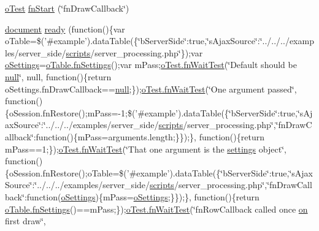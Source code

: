 \begin{DoxyCompactItemize}
\item 
\hyperlink{unit__test_8js_a3b2d259e2df3b6860d9047a92d09d0d6}{o\+Test} \hyperlink{4__server-side_2fn_draw_callback_8js_aa7072bcc36a7d3e1e58e8411fd1ed480}{fn\+Start} (\char`\"{}fn\+Draw\+Callback\char`\"{})
\item 
\hyperlink{outside_events_8js_aa14f8e0338cced6720590fd2ea13bd4b}{document} \hyperlink{4__server-side_2fn_draw_callback_8js_a7ab7695a6a02f5184cfc1fb9206111a5}{ready} (function()\{var o\+Table=\$('\#example').data\+Table(\{\char`\"{}b\+Server\+Side\char`\"{}\+:true,\char`\"{}s\+Ajax\+Source\char`\"{}\+:\char`\"{}../../../examples/server\+\_\+side/\hyperlink{tinymce_8jquery_8dev_8js_a09066d4d580eeec222f858d588b4cdef}{scripts}/server\+\_\+processing.\+php\char`\"{}\});var \hyperlink{model_8settings_8js_a4857b9c813b4dea010668e9555d0aca7}{o\+Settings}=\hyperlink{api_8methods_8js_a78f387fab92a85c2cb7830bc5d8a6141}{o\+Table.\+fn\+Settings}();var m\+Pass;\hyperlink{onhold_24__server-side_2__zero__config_8js_ab25c4d596771c0133cdc45178ce72c3d}{o\+Test.\+fn\+Wait\+Test}(\char`\"{}Default should be \hyperlink{validate_8js_afb8e110345c45e74478894341ab6b28e}{null}\char`\"{}, null, function()\{return o\+Settings.\+fn\+Draw\+Callback==\hyperlink{validate_8js_afb8e110345c45e74478894341ab6b28e}{null};\});\hyperlink{onhold_24__server-side_2__zero__config_8js_ab25c4d596771c0133cdc45178ce72c3d}{o\+Test.\+fn\+Wait\+Test}(\char`\"{}One argument passed\char`\"{}, function()\{o\+Session.\+fn\+Restore();m\+Pass=-\/1;\$('\#example').data\+Table(\{\char`\"{}b\+Server\+Side\char`\"{}\+:true,\char`\"{}s\+Ajax\+Source\char`\"{}\+:\char`\"{}../../../examples/server\+\_\+side/\hyperlink{tinymce_8jquery_8dev_8js_a09066d4d580eeec222f858d588b4cdef}{scripts}/server\+\_\+processing.\+php\char`\"{},\char`\"{}fn\+Draw\+Callback\char`\"{}\+:function()\{m\+Pass=arguments.\+length;\}\});\}, function()\{return m\+Pass==1;\});\hyperlink{onhold_24__server-side_2__zero__config_8js_ab25c4d596771c0133cdc45178ce72c3d}{o\+Test.\+fn\+Wait\+Test}(\char`\"{}That one argument is the \hyperlink{jquery_8tooltip_8js_a52fb9116a07f71570fbf0bd12ff4c9f8}{settings} object\char`\"{}, function()\{o\+Session.\+fn\+Restore();o\+Table=\$('\#example').data\+Table(\{\char`\"{}b\+Server\+Side\char`\"{}\+:true,\char`\"{}s\+Ajax\+Source\char`\"{}\+:\char`\"{}../../../examples/server\+\_\+side/\hyperlink{tinymce_8jquery_8dev_8js_a09066d4d580eeec222f858d588b4cdef}{scripts}/server\+\_\+processing.\+php\char`\"{},\char`\"{}fn\+Draw\+Callback\char`\"{}\+:function(\hyperlink{model_8settings_8js_a4857b9c813b4dea010668e9555d0aca7}{o\+Settings})\{m\+Pass=\hyperlink{model_8settings_8js_a4857b9c813b4dea010668e9555d0aca7}{o\+Settings};\}\});\}, function()\{return \hyperlink{api_8methods_8js_a78f387fab92a85c2cb7830bc5d8a6141}{o\+Table.\+fn\+Settings}()==m\+Pass;\});\hyperlink{onhold_24__server-side_2__zero__config_8js_ab25c4d596771c0133cdc45178ce72c3d}{o\+Test.\+fn\+Wait\+Test}(\char`\"{}fn\+Row\+Callback called once \hyperlink{fullpage_2plugin_8min_8js_a1cfa98b7fed2aaf9fee3b68dbb7f9497}{on} first draw\char`\"{}, 
\end{DoxyCompactItemize}
